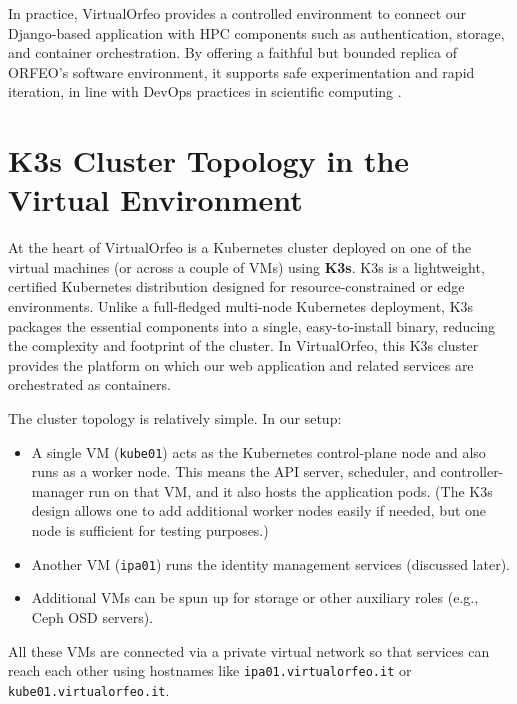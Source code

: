 \medskip

In practice, VirtualOrfeo provides a controlled environment to connect our Django-based application with HPC components such as authentication, storage, and container orchestration. By offering a faithful but bounded replica of ORFEO’s software environment, it supports safe experimentation and rapid iteration, in line with DevOps practices in scientific computing \parencite{Ohmura2023TwdsDT}.


\section{K3s Cluster Topology in the Virtual Environment}

At the heart of VirtualOrfeo is a Kubernetes cluster deployed on one of the 
virtual machines (or across a couple of VMs) using \textbf{K3s}. K3s is a 
lightweight, certified Kubernetes distribution designed for resource-constrained 
or edge environments\parencite{Rancher2021K3s}. Unlike a full-fledged multi-node 
Kubernetes deployment, K3s packages the essential components into a single, 
easy-to-install binary, reducing the complexity and footprint of the cluster. In 
VirtualOrfeo, this K3s cluster provides the platform on which our web application 
and related services are orchestrated as containers.

\medskip

The cluster topology is relatively simple. In our setup:  
\begin{itemize}
	\item A single VM (\texttt{kube01}) acts as the Kubernetes control-plane node 
	and also runs as a worker node. This means the API server, scheduler, and 
	controller-manager run on that VM, and it also hosts the application pods. 
	(The K3s design allows one to add additional worker nodes easily if needed, 
	but one node is sufficient for testing purposes.)
	\item Another VM (\texttt{ipa01}) runs the identity management services 
	(discussed later).
	\item Additional VMs can be spun up for storage or other auxiliary roles 
	(e.g., Ceph OSD servers).
\end{itemize}

All these VMs are connected via a private virtual network so that services can 
reach each other using hostnames like \texttt{ipa01.virtualorfeo.it} or 
\texttt{kube01.virtualorfeo.it}.

